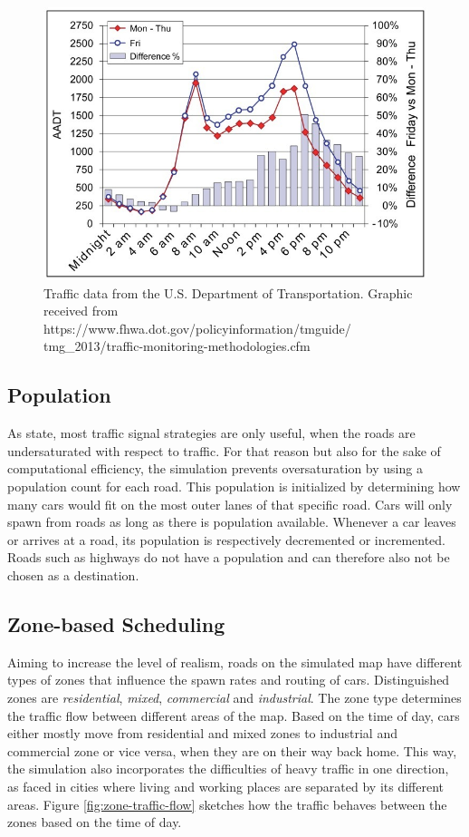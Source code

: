 \documentclass[11pt]{article}
\begin{document}
\begin{figure}[t]
	\includegraphics[width=\linewidth]{img/traffic-data.jpeg}
	\caption{Traffic data from the U.S. Department of Transportation. Graphic received from https://www.fhwa.dot.gov/policyinformation/tmguide/
	tmg\_2013/traffic-monitoring-methodologies.cfm \label{fig:traffic-data}}
\end{figure} 

\subsection{Population}
As \citet{papageorgiou2003review} state, most traffic signal strategies are only useful, when the roads are undersaturated with respect to traffic. For that reason but also for the sake of computational efficiency, the simulation prevents oversaturation by using a population count for each road. This population is initialized by determining how many cars would fit on the most outer lanes of that specific road. Cars will only spawn from roads as long as there is population available. Whenever a car leaves or arrives at a road, its population is respectively decremented or incremented. Roads such as highways do not have a population and can therefore also not be chosen as a destination.

\subsection{Zone-based Scheduling}
Aiming to increase the level of realism, roads on the simulated map have different types of zones that influence the spawn rates and routing of cars. Distinguished zones are \textit{residential}, \textit{mixed}, \textit{commercial} and \textit{industrial}. The zone type determines the traffic flow between different areas of the map. Based on the time of day, cars either mostly move from residential and mixed zones to industrial and commercial zone or vice versa, when they are on their way back home. This way, the simulation also incorporates the difficulties of heavy traffic in one direction, as faced in cities where living and working places are separated by its different areas. Figure \ref{fig:zone-traffic-flow} sketches how the traffic behaves between the zones based on the time of day.
\end{document}
